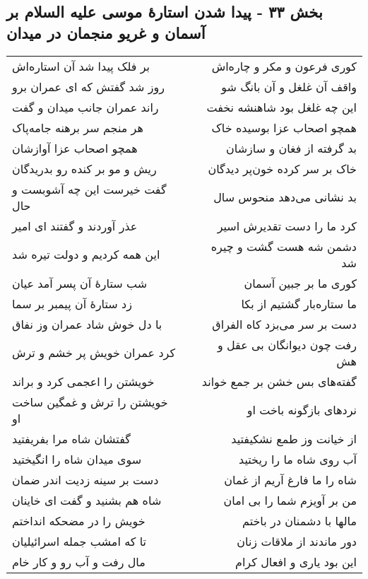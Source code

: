 \begin{center}
\section*{بخش ۳۳ - پیدا شدن استارهٔ موسی علیه السلام بر  آسمان و غریو منجمان در میدان}
\label{sec:sh033}
\begin{longtable}{l p{0.5cm} r}
بر فلک پیدا شد آن استاره‌اش
&&
کوری فرعون و مکر و چاره‌اش
\\
روز شد گفتش که ای عمران برو
&&
واقف آن غلغل و آن بانگ شو
\\
راند عمران جانب میدان و گفت
&&
این چه غلغل بود شاهنشه نخفت
\\
هر منجم سر برهنه جامه‌پاک
&&
همچو اصحاب عزا بوسیده خاک
\\
همچو اصحاب عزا آوازشان
&&
بد گرفته از فغان و سازشان
\\
ریش و مو بر کنده رو بدریدگان
&&
خاک بر سر کرده خون‌پر دیدگان
\\
گفت خیرست این چه آشوبست و حال
&&
بد نشانی می‌دهد منحوس سال
\\
عذر آوردند و گفتند ای امیر
&&
کرد ما را دست تقدیرش اسیر
\\
این همه کردیم و دولت تیره شد
&&
دشمن شه هست گشت و چیره شد
\\
شب ستارهٔ آن پسر آمد عیان
&&
کوری ما بر جبین آسمان
\\
زد ستارهٔ آن پیمبر بر سما
&&
ما ستاره‌بار گشتیم از بکا
\\
با دل خوش شاد عمران وز نفاق
&&
دست بر سر می‌بزد کاه الفراق
\\
کرد عمران خویش پر خشم و ترش
&&
رفت چون دیوانگان بی عقل و هش
\\
خویشتن را اعجمی کرد و براند
&&
گفته‌های بس خشن بر جمع خواند
\\
خویشتن را ترش و غمگین ساخت او
&&
نردهای بازگونه باخت او
\\
گفتشان شاه مرا بفریفتید
&&
از خیانت وز طمع نشکیفتید
\\
سوی میدان شاه را انگیختید
&&
آب روی شاه ما را ریختید
\\
دست بر سینه زدیت اندر ضمان
&&
شاه را ما فارغ آریم از غمان
\\
شاه هم بشنید و گفت ای خاینان
&&
من بر آویزم شما را بی امان
\\
خویش را در مضحکه انداختم
&&
مالها با دشمنان در باختم
\\
تا که امشب جمله اسرائیلیان
&&
دور ماندند از ملاقات زنان
\\
مال رفت و آب رو و کار خام
&&
این بود یاری و افعال کرام
\\

\end{longtable}
\end{center}
